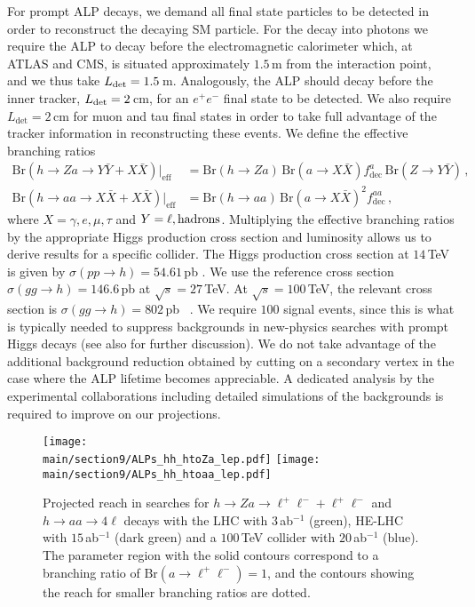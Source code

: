 For prompt ALP decays, we demand all final state particles to be detected in order to reconstruct the decaying SM particle. For the decay into photons we 
require the ALP to decay before the electromagnetic calorimeter which, at ATLAS and CMS, is situated approximately $1.5\,$m from the interaction point, and we thus take $L_{\rm det} = 
1.5\,$m. Analogously, the ALP should decay before the inner tracker, $L_{\rm det} = 2\,$cm, for an $e^+e^-$ final state to be detected. We also require $L_\text{det}
=2\,$cm for muon and tau final states in order to take full advantage of the tracker information in reconstructing these events. We define the effective branching ratios
%
\begin{align}
\text{Br}(h\to Za\to Y\bar{Y}+X\bar{X})\big\vert_\text{eff}&=\text{Br}(h\to Za)\,\text{Br}(a\to X\bar{X})f_\text{dec}^a\,\text{Br}(Z\to Y\bar{Y})\,,\label{eq:LHChZa}\\
\text{Br}(h\to aa\to X\bar{X}+X\bar{X})\big\vert_\text{eff}&=\text{Br}(h\to aa)\,\text{Br}(a\to X\bar{X})^2f_\text{dec}^{aa}\,,\label{eq:LHChaa}
\end{align}
%
where $X=\gamma, e, \mu, \tau$ and $Y=\ell, {\rm hadrons}$. Multiplying the effective branching ratios by the appropriate Higgs production cross section and luminosity allows us to derive results for a specific collider. The Higgs production cross section at $14\,$TeV is given by $\sigma(pp\to h)= 54.61\,$pb \cite{Anastasiou:2016cez}. We use the reference cross section $\sigma(gg 
\to h) = 146.6\,$pb \cite{Twiki} at $\sqrt{s} = 27\,$TeV. At $\sqrt{s} = 100\,$TeV, the relevant cross section is $\sigma(gg \to h) = 802\,$pb ~\cite{Mangano:2016jyj}. We require $100$ signal events, since this is what is typically needed to suppress backgrounds in new-physics searches with prompt Higgs decays \cite{Khachatryan:2016vau, Chatrchyan:2013vaa,Aad:2015bua} (see also \cite{Bauer:2017ris} for 
further discussion).
We do not take advantage of the additional background reduction obtained by cutting on a secondary vertex in the case where the ALP lifetime becomes appreciable. A dedicated analysis by the experimental collaborations including detailed simulations of the backgrounds is required to improve on our projections.  


%
\begin{figure}[t]
\begin{center}
\texttt{[image: \\main/section9/ALPs\_hh\_htoZa\_lep.pdf]}
\texttt{[image: \\main/section9/ALPs\_hh\_htoaa\_lep.pdf]}
\end{center}
\vspace{-3mm}
\caption{\label{fig:pphZalep} Projected reach in searches for $h \to Za \to \ell^+\ell^-+\ell^+\ell^- $ and $h \to aa \to 4\ell $ decays with the LHC with $3$\,ab$^{-1}$
(green), HE-LHC with $15$\,ab$^{-1}$ (dark green) and a $100\,$TeV collider with $20$\,ab$^{-1}$ (blue). The parameter region with the solid contours correspond to a branching ratio of $\text{Br}(a\to 
\ell^+\ell^-)=1$, and the contours showing the reach for smaller branching ratios are dotted.}
\end{figure}
%

